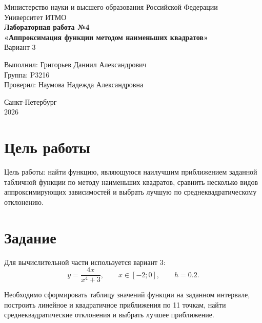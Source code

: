 \documentclass[a4paper,14pt]{extarticle}
\begin{document}
\begin{titlepage}
    \begin{center}
        Министерство науки и высшего образования Российской Федерации\\
        Университет ИТМО\\[2cm]

        \textbf{Лабораторная работа №4}\\[0.3cm]
        \textbf{«Аппроксимация функции методом наименьших квадратов»}\\[0.5cm]
        Вариант 3\\[3cm]
    \end{center}

    \begin{flushright}
        Выполнил: Григорьев Даниил Александрович\\
        Группа: P3216\\
        Проверил: Наумова Надежда Александровна\\
    \end{flushright}

    \vfill
    \begin{center}
        Санкт-Петербург\\
        2026
    \end{center}
\end{titlepage}

\tableofcontents
\newpage

\section{Цель работы}

Цель работы: найти функцию, являющуюся наилучшим приближением заданной табличной функции по методу наименьших квадратов, сравнить несколько видов аппроксимирующих зависимостей и выбрать лучшую по среднеквадратическому отклонению.

\section{Задание}

Для вычислительной части используется вариант 3:
\[
    y = \frac{4x}{x^4 + 3}, \qquad x \in [-2; 0], \qquad h = 0.2.
\]

Необходимо сформировать таблицу значений функции на заданном интервале, построить линейное и квадратичное приближения по 11 точкам, найти среднеквадратические отклонения и выбрать лучшее приближение.
\end{document}

